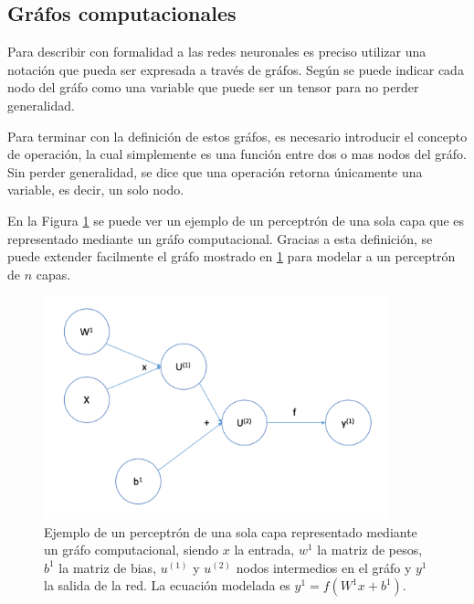 	\subsection{Gráfos computacionales}
	Para describir con formalidad a las redes neuronales es preciso utilizar una notación que pueda ser expresada a través de gráfos. Según \cite{deeplearningbook} se puede indicar cada nodo del gráfo como una variable que puede ser un tensor para no perder generalidad. 
	
	Para terminar con la definición de estos gráfos, es necesario introducir el concepto de operación, la cual simplemente es una función entre dos o mas nodos del gráfo. Sin perder generalidad, se dice que una operación retorna únicamente una variable, es decir, un solo nodo.
	
	En la Figura \ref{fig:grafo-computacional} se puede ver un ejemplo de un perceptrón de una sola capa que es representado mediante un gráfo computacional. Gracias a esta definición, se puede extender facilmente el gráfo mostrado en \ref{fig:grafo-computacional} para modelar a un perceptrón de $n$ capas.
	
	\begin{figure}[h]
		\centering
		\includegraphics[width=10cm]{capitulo2/images/grafo}
		\caption{Ejemplo de un perceptrón de una sola capa representado mediante un gráfo computacional, siendo $x$ la entrada, $w^{1}$ la matriz de pesos, $b^{1}$ la matriz de bias, $u^{(1)}$ y $u^{(2)}$ nodos intermedios en el gráfo y $y^{1}$ la salida de la red. La ecuación modelada es $y ^ {1} = f(W^{1}x + b ^ {1})$.}
		\label{fig:grafo-computacional}
	\end{figure}



